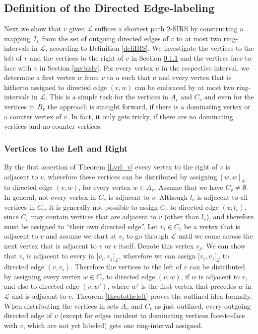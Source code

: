 \documentclass[10pt]{article}
\newcommand{\q}[1]{``#1''}\newcommand{\fu}[1]{\mathcal{#1}}\newcommand{\mc}[1]{\mathsf{#1}}\newcommand{\ri}[1]{\mathscr{#1}}\newcommand{\co}[1]{\fu{C}({#1})}\newcommand{\lc}[1]{\alpha(#1)}\newcommand{\rc}[1]{\beta(#1)}\newcommand{\ema}[1]{\mathcal{#1}}\newcommand{\fe}[2]{\fu{F}(#1,#2)}\newcommand{\lv}[1]{l_{#1}}\newcommand{\rv}[1]{r_{#1}}\newcommand{\mv}[1]{m_{#1}}\newcommand{\lvv}{\lv{v}}
\begin{document}
\subsection{Definition of the Directed Edge-labeling}\label{2-app}



Next we show that $v$ given $\ri{L}$ suffices a shortest 
path $2$-SIRS by constructing a mapping $\ema{I}_v$ from the set of outgoing directed edges of $v$ 
to at most two ring-intervals in $\ri{L}$, according to Definition \ref{defiIRS}.
We investigate the vertices to the left of $v$ and the vertices 
to the right of $v$ in Section \ref{lvbisv} and the vertices face-to-face with $v$ 
in Section \ref{mvbislv}.
For every vertex $u$ in the respective interval, we determine a first vertex $w$ from 
$v$ to $u$ such that $u$ and every vertex that is hitherto assigned to directed edge $(v,w)$ can 
be embraced by at most two ring-intervals in $\ri{L}$.
This is a simple task for the vertices in $A_v$ and $C_v$ and 
even for the vertices in $B_v$ the approach is straight forward, if there is a 
dominating vertex or a counter vertex of $v$.
In fact, it only gets tricky, if there are no dominating vertices and no 
counter vertices.






\subsubsection{Vertices to the Left and Right}\label{lvbisv}





By the first assertion of Theorem \ref{Lvrl_v} every vertex to the right of $v$ is 
adjacent to $v$, wherefore these vertices can be distributed by assigning $[w,w]_\ri{L}$ 
to directed edge $(v,w)$, for every vertex $w\in A_v$. 
Assume that we have $C_v\neq\emptyset$.
In general, not every vertex in $C_v$ is adjacent to $v$. Although $\lvv$ is adjacent to all vertices in $C_v$, it is generally not possible to assign 
$C_v$ to directed edge $(v,\lvv)$, since $C_v$ may contain vertices that are adjacent to $v$ (other than $\lvv$), and therefore must be assigned 
to \q{their own directed edge}.
Let $v_i\in C_v$ be a vertex that is adjacent to $v$ and assume we start at $v_i$ to go through 
$\ri{L}$ until we come across the next vertex that is adjacent to $v$ or $v$ itself.
Denote this vertex $v_j$.
We can show that $v_i$ is adjacent to every in $]v_i,v_j]_\ri{L}$, wherefore we 
can assign $[v_i,v_j[_\ri{L}$ to directed edge $(v,v_i)$.
Therefore the vertices to the left of $v$ can be distributed by assigning every vertex 
$w\in C_v$ to directed edge $(v,w)$, if $w$ is adjacent to $v$, and else to directed edge $(v,w')$, where $w'$ 
is the first vertex that precedes $w$ in $\ri{L}$ and is adjacent to  $v$.
Theorem \ref{theototheleft} proves the outlined idea formally.
When distributing the vertices in sets $A_v$ and $C_v$ as just outlined, every 
outgoing directed edge of $v$ (except for edges incident to dominating vertices face-to-face with $v$, which are not yet labeled) gets one ring-interval assigned.
\end{document}
